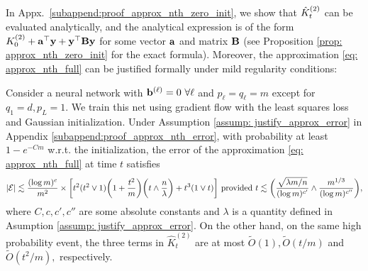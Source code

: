 

In Appx.~\ref{subappend:proof_approx_nth_zero_init}, we show that ${\hat{K}}^{(2)}_t$ can be evaluated analytically, and the analytical expression is of the form ${K}^{(2)}_0 + {\mathbf{a}}^\top {\mathbf{y}} + {\mathbf{y}}^\top {\mathbf{B}} {\mathbf{y}}$ for some vector ${\mathbf{a}}$ and matrix ${\mathbf{B}}$ (see Proposition \ref{prop: approx_nth_zero_init} for the exact formula). 
Moreover, the approximation \eqref{eq: approx_nth_full} can be justified formally under mild regularity conditions: 
\begin{theorem}
	\label{thm: approx_nth_error}
	Consider a neural network with ${\mathbf{b}}^{(\ell)} = 0 \ \forall \ell$ and $p_\ell = q_\ell = m$ except for $q_1 = d, p_L = 1$. We train this net using gradient flow with the least squares loss and Gaussian initialization. Under Assumption \ref{assump: justify_approx_error} in Appendix \ref{subappend:proof_approx_nth_error}, with probability at least $1-e^{-Cm}$ w.r.t. the initialization, the error of the approximation \eqref{eq: approx_nth_full} at time $t$ satisfies 
	\[
		|{\mathcal{E}}| \lesssim \frac{(\log m)^c}{m^2} \times\bigg[ t^2(t^2\lor 1) \bigg(1+\frac{t^2}{m}\bigg)\bigg(t \land \frac{n}{\lambda}\bigg) + t^3(1\lor t) \bigg] \textnormal{ provided }  t \lesssim \bigg({\frac{\sqrt{\lambda m/n}}{(\log m)^{c'}}} \land \frac{m^{1/3}}{(\log m)^{c''}}\bigg),
	\]
	where $C, c, c', c''$ are some absolute constants and $\lambda$ is a quantity defined in Asumption \ref{assump: justify_approx_error}. On the other hand, on the same high probability event, the three terms in $\hat{K}^{(2)}_t$ are at most $\tilde{O}(1), \tilde{O}(t/m)$ and $\tilde{O}(t^2/m),$
	respectively.
\end{theorem}

